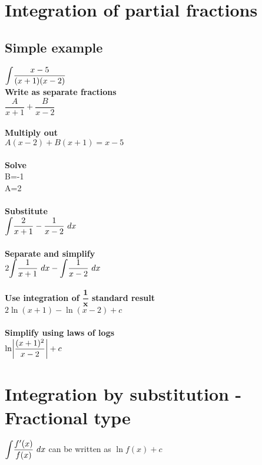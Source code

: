 \documentclass{article}[18pt]
\DeclarePairedDelimiter\abs{\lvert}{\rvert}
\begin{document}
\section{Integration of partial fractions}
\subsection{Simple example}
$\mathlarger{\int}\dfrac{x-5}{(x+1)(x-2)}$\\
\textbf{Write as separate fractions}\\
$\dfrac{A}{x+1}+\dfrac{B}{x-2}$\\
\\
\textbf{Multiply out}\\
$A(x-2)+B(x+1)=x-5$\\
\\
\textbf{Solve}\\
B=-1\\
A=2\\
\\
\textbf{Substitute}\\
$\mathlarger{\int}\dfrac{2}{x+1}-\dfrac{1}{x-2} \ dx$\\
\\
\textbf{Separate and simplify}\\
$2\mathlarger{\int}\dfrac{1}{x+1} \ dx-\mathlarger{\int}\dfrac{1}{x-2} \ dx$\\
\\
\textbf{Use integration of $\mathbf{\dfrac{1}{x}}$ standard result}\\
$2\ln(x+1)-\ln(x-2)+c$\\
\\
\textbf{Simplify using laws of logs}\\
$\ln\abs*{\dfrac{(x+1)^2}{x-2}}+c$
\section{Integration by substitution - Fractional type}
$\mathlarger{\int}\dfrac{f'(x)}{f(x)} \ dx$ can be written as $\ln f(x)+c$\\
\end{document}

